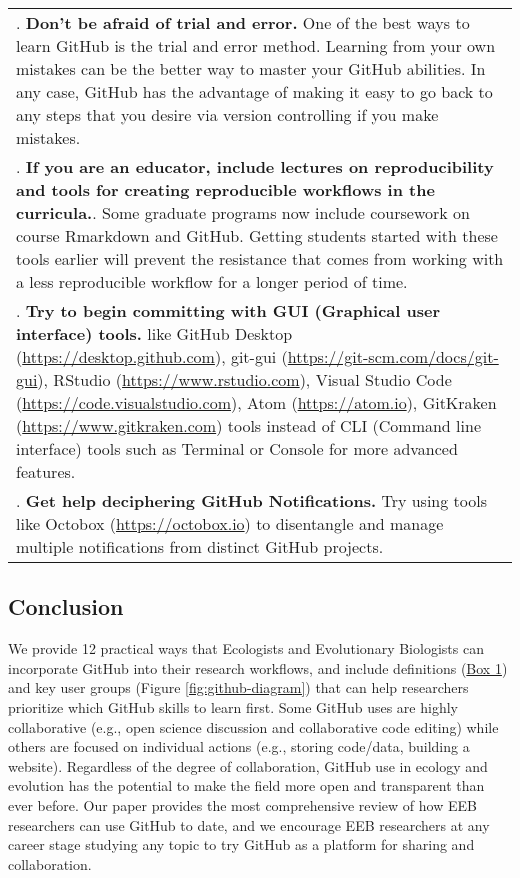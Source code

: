 \begin{tablenos:no-prefix-table-caption}
\begin{longtable}[]{@{}
  >{\raggedright\arraybackslash}p{}@{}}
7. \textbf{Don't be afraid of trial and error.} One of the best ways to learn GitHub is the trial and error method. Learning from your own mistakes can be the better way to master your GitHub abilities. In any case, GitHub has the advantage of making it easy to go back to any steps that you desire via version controlling if you make mistakes. \\
8. \textbf{If you are an educator, include lectures on reproducibility and tools for creating reproducible workflows in the curricula.}. Some graduate programs now include coursework on course Rmarkdown and GitHub. Getting students started with these tools earlier will prevent the resistance that comes from working with a less reproducible workflow for a longer period of time. \\
9. \textbf{Try to begin committing with GUI (Graphical user interface) tools.} like GitHub Desktop (\url{https://desktop.github.com}), git-gui (\url{https://git-scm.com/docs/git-gui}), RStudio (\url{https://www.rstudio.com}), Visual Studio Code (\url{https://code.visualstudio.com}), Atom (\url{https://atom.io}), GitKraken (\url{https://www.gitkraken.com}) tools instead of CLI (Command line interface) tools such as Terminal or Console for more advanced features. \\
10. \textbf{Get help deciphering GitHub Notifications.} Try using tools like Octobox (\url{https://octobox.io}) to disentangle and manage multiple notifications from distinct GitHub projects. \\
\bottomrule
\end{longtable}

\end{tablenos:no-prefix-table-caption}

\hypertarget{conclusion}{%
\subsection{Conclusion}\label{conclusion}}

We provide 12 practical ways that Ecologists and Evolutionary Biologists can incorporate GitHub into their research workflows, and include definitions (\protect\hyperlink{definitions}{Box 1}) and key user groups (Figure \ref{fig:github-diagram}) that can help researchers prioritize which GitHub skills to learn first.
Some GitHub uses are highly collaborative (e.g., open science discussion and collaborative code editing) while others are focused on individual actions (e.g., storing code/data, building a website).
Regardless of the degree of collaboration, GitHub use in ecology and evolution has the potential to make the field more open and transparent than ever before.
Our paper provides the most comprehensive review of how EEB researchers can use GitHub to date, and we encourage EEB researchers at any career stage studying any topic to try GitHub as a platform for sharing and collaboration.

